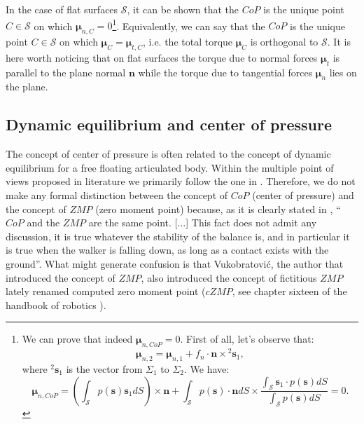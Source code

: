 \documentclass[12pt,a4paper,twoside]{article}
\begin{document}
In the case of flat surfaces $\mathcal S$, it can be shown \cite{sardain2004} that the $CoP$ is the unique point $C \in \mathcal S$ on which $\boldsymbol\mu_{n,C} = 0$\footnote{We can prove that indeed $\boldsymbol\mu_{n,CoP} = 0$. First of all, let's observe that:
$$ 
\boldsymbol\mu_{n,2} = \boldsymbol\mu_{n,1} + f_n \cdot \mathbf n \times \mathbf {}^2 \mathbf s_{1},
$$
where ${}^2 \mathbf s_{1}$ is the vector from $\Sigma_1$ to $\Sigma_2$. We have:
$$
\boldsymbol\mu_{n,CoP} = \left( \int_{\mathcal S} p(\mathbf s) \mathbf s_1 dS \right) \times \mathbf n  + \int_{\mathcal S} p(\mathbf s) \cdot \mathbf n dS \times \frac{\int_{\mathcal S} \mathbf s_1 \cdot p(\mathbf s) dS}{\int_{\mathcal S} p(\mathbf s) dS} = 0.
$$}. Equivalently, we can say that the $CoP$ is the unique point $C \in \mathcal S$ on which  $\boldsymbol\mu_{C} = \boldsymbol\mu_{t,C}$, i.e. the total torque $\boldsymbol\mu_{C}$ is orthogonal to $\mathcal S$. It is here worth noticing that on flat surfaces the torque due to normal forces $\boldsymbol\mu_{t}$ is parallel to the plane normal $\mathbf n$ while the torque due to tangential forces $\boldsymbol\mu_{n}$ lies on the plane. 

\subsection{Dynamic equilibrium and center of pressure}

The concept of center of pressure is often related to the concept of dynamic equilibrium for a free floating articulated body. Within the multiple point of views proposed in literature we primarily follow the one in \cite{sardain2004}. Therefore, we do not make any formal distinction between the concept of $CoP$ (center of pressure) and the concept of $ZMP$ (zero moment point) because, as it is clearly stated in \cite{sardain2004}, ``$CoP$ and the $ZMP$ are the same point. [$\dots$] This fact does not admit any discussion, it is true whatever the stability of the balance is, and in particular it is true when the walker is falling down, as long as a contact exists with the ground''. What might generate confusion is that Vukobratovi\'c, the author that introduced the concept of $ZMP$, also introduced the concept of fictitious $ZMP$ lately renamed computed zero moment point ($cZMP$, see chapter sixteen of the handbook of robotics \cite{handbook2008}). 
\end{document}
